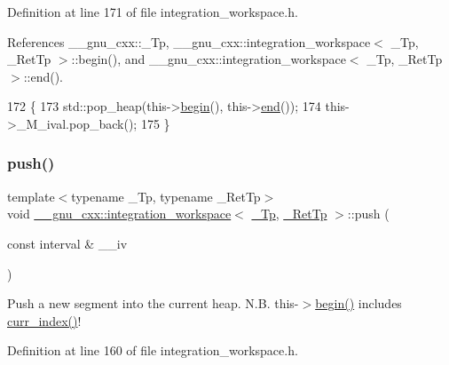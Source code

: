 Definition at line 171 of file integration\+\_\+workspace.\+h.



References \+\_\+\+\_\+gnu\+\_\+cxx\+::\+\_\+\+Tp, \+\_\+\+\_\+gnu\+\_\+cxx\+::integration\+\_\+workspace$<$ \+\_\+\+Tp, \+\_\+\+Ret\+Tp $>$\+::begin(), and \+\_\+\+\_\+gnu\+\_\+cxx\+::integration\+\_\+workspace$<$ \+\_\+\+Tp, \+\_\+\+Ret\+Tp $>$\+::end().


\begin{DoxyCode}
172       \{
173         std::pop\_heap(this->\hyperlink{class____gnu__cxx_1_1integration__workspace_a9ecef94e75c1bc84e59300fe6504eed9}{begin}(), this->\hyperlink{class____gnu__cxx_1_1integration__workspace_a0494e3b36de996e0a85552aaaac11c03}{end}());
174         this->\_M\_ival.pop\_back();
175       \}
\end{DoxyCode}
\mbox{\label{class____gnu__cxx_1_1integration__workspace_a3d4ccc05a0cc0a2cda9cf2a5243b804d}} 
\subsubsection{\texorpdfstring{push()}{push()}}
{\footnotesize\ttfamily template$<$typename \+\_\+\+Tp, typename \+\_\+\+Ret\+Tp$>$ \\
void \hyperlink{class____gnu__cxx_1_1integration__workspace}{\+\_\+\+\_\+gnu\+\_\+cxx\+::integration\+\_\+workspace}$<$ \hyperlink{namespace____gnu__cxx_a3b19a9c800ca194374ef9172290f7d79}{\+\_\+\+Tp}, \hyperlink{namespace____gnu__cxx_a886e03ece3d53ff7fa6c098a40f93fa5}{\+\_\+\+Ret\+Tp} $>$\+::push (\begin{DoxyParamCaption}\item[{const interval \&}]{\+\_\+\+\_\+iv }\end{DoxyParamCaption})\hspace{0.3cm}{\ttfamily [inline]}}

Push a new segment into the current heap. N.\+B. this-\/$>$\hyperlink{class____gnu__cxx_1_1integration__workspace_a9ecef94e75c1bc84e59300fe6504eed9}{begin()} includes \hyperlink{class____gnu__cxx_1_1integration__workspace_a51a384b1777615943add69f1895454f5}{curr\+\_\+index()}! 

Definition at line 160 of file integration\+\_\+workspace.\+h.



